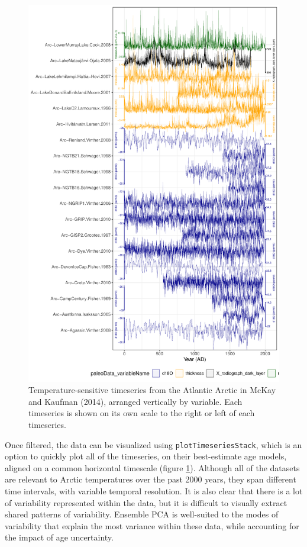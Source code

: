 \documentclass[gchron, manuscript]{copernicus}
\begin{document}
\begin{figure}
\includegraphics[width=12cm]{geoChronR-paper_files/figure-latex/timeseries-stack-1} \caption{Temperature-sensitive timeseries from the Atlantic Arctic in McKay and Kaufman (2014), arranged vertically by variable. Each timeseries is shown on its own scale to the right or left of each timeseries.}\label{fig:timeseries-stack}
\end{figure}

Once filtered, the data can be visualized using \texttt{plotTimeseriesStack}, which is an option to quickly plot all of the timeseries, on their best-estimate age models, aligned on a common horizontal timescale (figure \ref{fig:timeseries-stack}). Although all of the datasets are relevant to Arctic temperatures over the past 2000 years, they span different time intervals, with variable temporal resolution. It is also clear that there is a lot of variability represented within the data, but it is difficult to visually extract shared patterns of variability.
Ensemble PCA is well-suited to the modes of variability that explain the most variance within these data, while accounting for the impact of age uncertainty.
\end{document}
